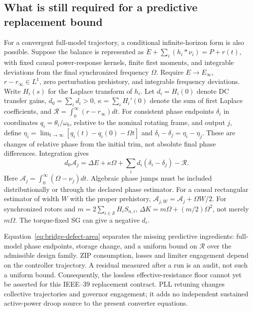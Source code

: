 \subsection{What is still required for a predictive replacement bound}
For a convergent full-model trajectory, a conditional infinite-horizon form
is also possible. Suppose the balance is represented as
$\dot E+\sum_i(h_i*\nu_i)=P+r(t)$, with fixed causal power-response kernels,
finite first moments, and integrable deviations from the final synchronized
frequency $\Omega$. Require $E\to E_\infty$, $r-r_\infty\in L^1$,
zero perturbation prehistory, and integrable frequency deviations.
Write $H_i(s)$ for the Laplace transform of $h_i$.
Let $d_i=H_i(0)$ denote DC transfer gains,
$d_0=\sum_i d_i>0$, $\kappa=\sum_i H_i'(0)$ denote the sum of first Laplace
coefficients, and $\mathcal R=\int_0^\infty(r-r_\infty)dt$.
For consistent phase endpoints $\delta_i$ in coordinates
$q_i=\theta_i/\omega_b$, relative to the nominal rotating frame, and
output $j$, define
$\eta_i=\lim_{t\to\infty}[q_i(t)-q_i(0)-\Omega t]$ and
$\delta_i-\delta_j=\eta_i-\eta_j$. These are changes of relative phase
from the initial trim, not absolute final phase differences. Integration gives
\begin{equation}
 d_0\mathcal A_j=\Delta E+\kappa\Omega
       +\sum_i d_i(\delta_i-\delta_j)-\mathcal R .
 \label{eq:bridge-defect-area}
\end{equation}
Here $\mathcal A_j=\int_0^\infty(\Omega-\nu_j)dt$. Algebraic phase jumps
must be included distributionally or through the declared phase estimator.
For a causal rectangular estimator of width $W$ with the proper prehistory,
$\mathcal A_{j,W}=\mathcal A_j+\Omega W/2$.
For synchronized rotors and $m=2\sum_{i\in\mathcal S}H_iS_{n,i}$,
$\Delta K=m\Omega+(m/2)\Omega^2$, not merely $m\Omega$.
The torque-fixed SG can give a negative $d_i$.

Equation~\eqref{eq:bridge-defect-area} separates the missing predictive
ingredients: full-model phase endpoints, storage change, and a uniform bound
on $\mathcal R$ over the admissible design family. ZIP consumption, losses
and limiter engagement depend on the controller trajectory. A residual
measured after a run is an audit, not such a uniform bound. Consequently,
the lossless effective-resistance floor cannot yet be asserted for this
IEEE--39 replacement contract. PLL retuning changes collective trajectories
and governor engagement; it adds no independent sustained active-power
droop source to the present converter equations.

